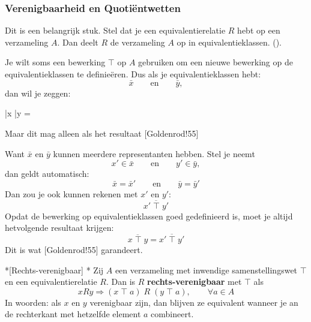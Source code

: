 \subsubsection{Verenigbaarheid en Quotiëntwetten}

Dit is een belangrijk stuk. Stel dat je een equivalentierelatie $R$ hebt op een verzameling $A$. Dan deelt $R$ de verzameling $A$ op in equivalentieklassen. ().

Je wilt soms een bewerking $\top$ op $A$ gebruiken om een nieuwe bewerking op de equivalentieklassen te definieëren. Dus als je equivalentieklassen hebt:
\begin{equation*}
    \bar{x} \qquad \text{en} \qquad \bar{y},
\end{equation*}
dan wil je zeggen:
\begin{equationbox}[NavyBlue]
    \bar{x} \overline{\top} \bar{y} = 
\end{equationbox}
Maar dit mag alleen als het resultaat [Goldenrod!55]

Want $\bar{x}$ en $\bar{y}$ kunnen meerdere representanten hebben. Stel je neemt
\begin{equation*}
    x'\in \bar{x} \qquad \text{en} \qquad y' \in \bar{y},
\end{equation*}
dan geldt automatisch:
\begin{equation*}
    \bar{x} = \bar{x}' \qquad \text{en} \qquad \bar{y} = \bar{y}'
\end{equation*}
Dan zou je ook kunnen rekenen met $x'$ en $y'$:
\begin{equation*}
    \overline{x'\;\top\;y'}
\end{equation*}
Opdat de bewerking op equivalentieklassen goed gedefinieerd is, moet je altijd hetvolgende resultaat krijgen:
\begin{equation*}
    \overline{x\;\top\;y} = \overline{x'\;\top\;y'}
\end{equation*}
Dit is wat [Goldenrod!55] garandeert.


\begin{nicedefinition}*[Rechts-verenigbaar]
    \nextpart[]*
    Zij $A$ een verzameling met inwendige samenstellingswet $\top$ en een equivalentierelatie $R$. Dan is $R$ \textcolor{PineGreen!75!black}{\textbf{rechts-verenigbaar}} met $\top$ als
    \begin{equation*}
        xRy \Rightarrow (x\;\top\;a)\;R\;(y\;\top\;a), \qquad \forall a \in A
    \end{equation*}
    In woorden: als $x$ en $y$ verenigbaar zijn, dan blijven ze equivalent wanneer je an de rechterkant met hetzelfde element $a$ combineert.
\end{nicedefinition}


